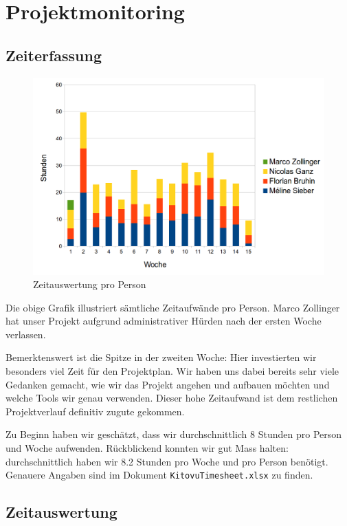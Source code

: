 \documentclass[a4paper]{article}
\let\oldsection\section
\renewcommand\section{\clearpage\oldsection}
\begin{document}
\section{Projektmonitoring}

\subsection{Zeiterfassung}

\begin{figure}[H]
  \includegraphics[width=\linewidth]{./img/time_per_person.png}
  \caption{Zeitauswertung pro Person\protect\footnotemark}
\end{figure}

Die obige Grafik illustriert sämtliche Zeitaufwände pro Person. Marco Zollinger hat unser Projekt aufgrund administrativer Hürden nach der ersten Woche verlassen.

Bemerktenswert ist die Spitze in der zweiten Woche: Hier investierten wir besonders viel Zeit für den Projektplan.
Wir haben uns dabei bereits sehr viele Gedanken gemacht, wie wir das Projekt angehen und aufbauen möchten und welche Tools wir genau verwenden. Dieser hohe Zeitaufwand ist dem restlichen Projektverlauf definitiv zugute gekommen.

Zu Beginn haben wir geschätzt, dass wir durchschnittlich 8 Stunden pro Person
und Woche aufwenden. Rückblickend konnten wir gut Mass halten: durchschnittlich haben wir 8.2 Stunden pro Woche und pro Person benötigt.
Genauere Angaben sind im Dokument \verb|KitovuTimesheet.xlsx| zu finden.

\subsection{Zeitauswertung}
\end{document}
